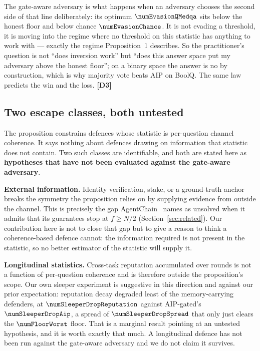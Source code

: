 The gate-aware adversary is what happens when an adversary chooses the second
side of that line deliberately: its optimum $\numEvasionQMedqa$ sits below the
honest floor and below chance $\numEvasionChance$. It is not evading a threshold,
it is moving into the regime where no threshold on this statistic has anything to
work with --- exactly the regime Proposition~1 describes. So the practitioner's
question is not ``does inversion work'' but ``does this answer space put my
adversary above the honest floor''; on a binary space the answer is no by
construction, which is why majority vote beats AIP on BoolQ. The same law
predicts the win and the loss. \textbf{[D3]}

\subsection{Two escape classes, both untested}

The proposition constrains defences whose statistic is per-question channel
coherence. It says nothing about defences drawing on information that statistic
does not contain. Two such classes are identifiable, and both are stated here as
\textbf{hypotheses that have not been evaluated against the gate-aware
adversary}.

\textbf{External information.} Identity verification, stake, or a ground-truth
anchor breaks the symmetry the proposition relies on by supplying evidence from
outside the channel. This is precisely the gap AgentChain~\cite{agentchain}
names as unsolved when it admits that its guarantees stop at $f \geq N/2$
(Section~\ref{sec:related}). Our contribution here is not to close that gap but
to give a reason to think a coherence-based defence cannot: the information
required is not present in the statistic, so no better estimator of the statistic
will supply it.

\textbf{Longitudinal statistics.} Cross-task reputation accumulated over rounds
is not a function of per-question coherence and is therefore outside the
proposition's scope. Our own sleeper experiment is suggestive in this direction
and against our prior expectation: reputation decay degraded least of the
memory-carrying defenders, at $\numSleeperDropReputation$ against AIP-gated's
$\numSleeperDropAip$, a spread of $\numSleeperDropSpread$ that only just clears
the $\numFloorWorst$ floor. That is a marginal result pointing at an untested
hypothesis, and it is worth exactly that much. A longitudinal defence has not
been run against the gate-aware adversary and we do not claim it survives.

